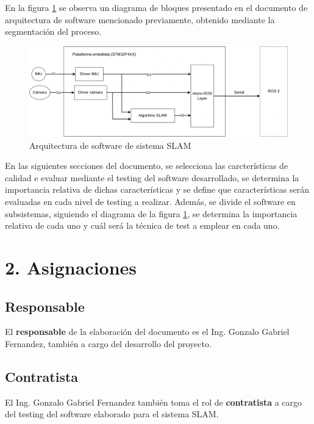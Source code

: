 \documentclass[
11pt, %
codirector, %
]{simple_charter}
\begin{document}
En la figura \ref{fig:software-arch} se observa un diagrama de bloques presentado en el documento de
arquitectura de software mencionado previamente, obtenido mediante la segmentación del proceso.

\begin{figure}[ht]
	\centering
	\includegraphics[width=\textwidth]{imgs/polyphemus_pipeline.png}
	\caption{Arquitectura de software de sistema SLAM}
	\label{fig:software-arch}
\end{figure}

En las siguientes secciones del documento, se selecciona las carcterísticas de calidad e evaluar
mediante  el testing del software desarrollado, se determina la importancia relativa de dichas
características y se define que características serán evaluadas en cada nivel de testing a realizar.
Además, se  divide el software en subsistemas, siguiendo el diagrama de la figura
\ref{fig:software-arch}, se determina la importancia relativa de cada uno y cuál será la técnica de
test a emplear en cada uno.

\section{2. Asignaciones}
\label{sec:2-asignaciones}

\subsection{Responsable}
\label{ssec:responsable}

El \textbf{responsable} de la elaboración del documento es el Ing. Gonzalo Gabriel Fernandez,
también a cargo del desarrollo del proyecto.

\subsection{Contratista}
\label{ssec:contratista}

El Ing. Gonzalo Gabriel Fernandez también toma el rol de \textbf{contratista} a cargo del testing
del software elaborado para el sistema SLAM.
\end{document}
